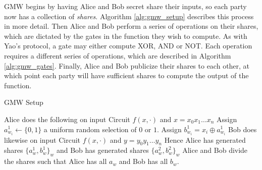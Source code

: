 \documentclass[12pt,twoside]{reedthesis}
\begin{document}
GMW begins by having Alice and Bob secret share their inputs, so each party now has a collection of \textit{shares}. 
Algorithm \ref{alg:gmw_setup} describes this process in more detail.
Then Alice and Bob perform a series of operations on their shares, which are dictated by the gates in the function they wish to compute.
As with Yao's protocol, a gate may either compute XOR, AND or NOT.
Each operation requires a different series of operations, which are described in Algorithm \ref{alg:gmw_gates}.
Finally, Alice and Bob publicize their shares to each other, at which point each party will have sufficient shares to compute the output of the function.

\begin{algorithm}[h!]
\caption{GMW Setup}
\label{alg:gmw_setup}
\begin{algorithmic}
    \State Alice does the following on input Circuit $f(x,\cdot)$ and $x = x_0x_1\ldots x_n$
        \State Assign $a^1_{w_i} \leftarrow \{0,1\}$
        \Comment a uniform random selection of $0$ or $1$.
        \State Assign $b^1_{w_i} = x_i \oplus a_{w_i}^1$
    \EndFor
    \State Bob does likewise on input Circuit $f(x,\cdot)$ and $y = y_0y_1\ldots y_n$
    \State Hence Alice has generated shares $\{a^1_w, b^1_w\}_w$ 
    \State and Bob has generated shares $\{a^2_w, b^2_w\}_w$
    \State Alice and Bob divide the shares such that Alice has all $a_w$ and Bob has all $b_w$.
\end{algorithmic}
\end{algorithm}
\end{document}
